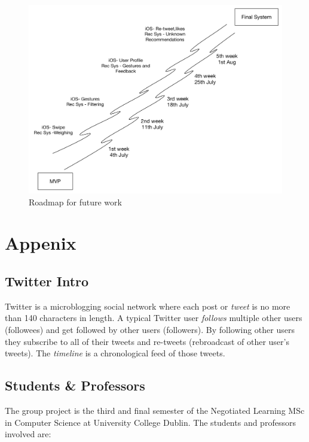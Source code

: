 \documentclass{article}
\begin{document}
\begin{figure}[H]
    \centering
    \includegraphics[width=\textwidth]{RoadMap}  
    \caption{Roadmap for future work}
\end{figure}

\newpage


\section{Appenix}

\subsection{Twitter Intro}
Twitter is a microblogging social network where each post or \textit{tweet} is no more than 140 characters in length. A typical Twitter user \textit{follows} multiple other users (followees) and get followed by other users (followers). By following other users they subscribe to all of their tweets and re-tweets (rebroadcast of other user's tweets). The \textit{timeline} is a chronological feed of those tweets.

\subsection{Students \& Professors}
The group project is the third and final semester of the Negotiated Learning MSc in Computer Science at University College Dublin. The students and professors involved are:
        
\end{document}
